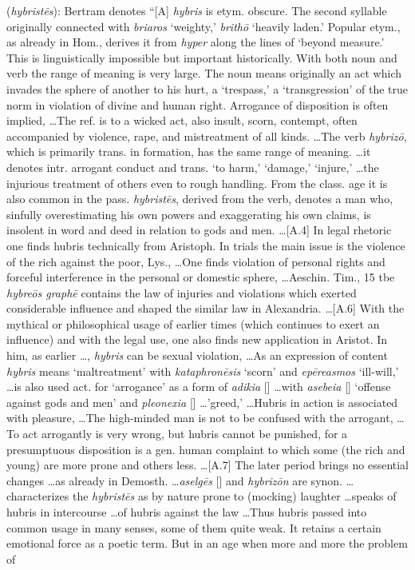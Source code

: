 \item[Hubris,]

(\textit{hybristēs}):
Bertram denotes ``[A] \emph{hybris} is etym. obscure. The second syllable originally connected with \emph{briaros} `weighty,' \emph{brithō} `heavily laden.' Popular etym., as already in Hom., derives it from \emph{hyper} along the lines of `beyond measure.' This is linguistically impossible but important historically. With both noun and verb the range of meaning is very large. The noun means originally an act which invades the sphere of another to his hurt, a `trespass,' a `transgression' of the true norm in violation of divine and human right. Arrogance of disposition is often implied, \ldots The ref. is to a wicked act, also insult, scorn, contempt, often accompanied by violence, rape, and mistreatment of all kinds. \ldots The verb \emph{hybrizō}, which is primarily trans. in formation, has the same range of meaning. \ldots it denotes intr. arrogant conduct and trans. `to harm,' `damage,' `injure,' \ldots the injurious treatment of others even to rough handling. From the class. age it is also common in the pass. \emph{hybristēs}, derived from the verb, denotes a man who, sinfully overestimating his own powers and exaggerating his own claims, is insolent in word and deed in relation to gods and men. \ldots [A.4] In legal rhetoric one finds hubris technically from Aristoph. In trials the main issue is the violence of the rich against the poor, Lys., \ldots One finds violation of personal rights and forceful interference in the personal or domestic sphere, \ldots Aeschin. Tim., 15 tbe \emph{hybreōs graphē} contains the law of injuries and violations which exerted considerable influence and shaped the similar law in Alexandria. \ldots [A.6] With the mythical or philosophical usage of earlier times  (which continues to exert an influence) and with the legal use, one also finds new application in Aristot. In him, as earlier \ldots, \emph{hybris} can be sexual violation, \ldots As an expression of content \emph{hybris} means `maltreatment' with \emph{kataphronēsis} `scorn' and \emph{epēreasmos} `ill-will,' \ldots is also used act. for `arrogance' as a form of \emph{adikia} [] \ldots with \emph{asebeia} [] `offense against gods and men' and \emph{pleonexia} [] \ldots 'greed,' \ldots Hubris in action is associated with pleasure, \ldots The high-minded man is not to be confused with the arrogant, \ldots To act arrogantly is very wrong, but hubris cannot be punished, for a presumptuous disposition is a gen. human complaint to which some  (the rich and young) are more prone and others less. \ldots [A.7] The later period brings no essential changes \ldots as already in Demosth. \ldots \emph{aselgēs} [] and \emph{hybrizōn} are synon. \ldots characterizes the \emph{hybristēs} as by nature prone to (mocking) laughter \ldots speaks of hubris in intercourse \ldots of hubris against the law \ldots Thus hubris passed into common usage in many senses, some of them quite weak. It retains a certain emotional force as a poetic term. But in an age when more and more the problem of 